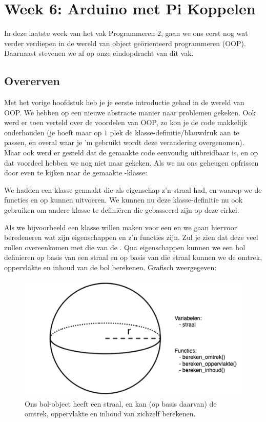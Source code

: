 \chapter{Week 6: Arduino met Pi Koppelen}

In deze laatste week van het vak Programmeren 2, gaan we ons eerst nog wat verder verdiepen in de wereld van object geörienteerd programmeren (OOP). Daarnaast stevenen we af op onze eindopdracht van dit vak.

\section{Overerven}
Met het vorige hoofdstuk heb je je eerste introductie gehad in de wereld van OOP. We hebben op een nieuwe abstracte manier naar problemen gekeken. Ook werd er toen verteld over de voordelen van OOP, zo kon je de code makkelijk onderhouden (je hoeft maar op $1$ plek de klasse-definitie/blauwdruk aan te passen, en overal waar je 'm gebruikt wordt deze verandering overgenomen). Maar ook werd er gesteld dat de gemaakte code eenvoudig uitbreidbaar is, en op dat voordeel hebben we nog niet naar gekeken. Als we nu ons geheugen opfrissen door even te kijken naar de gemaakte -klasse:


We hadden een klasse  gemaakt die als eigenschap z'n straal had, en waarop we de functies  en  op kunnen uitvoeren. We kunnen nu deze klasse-definitie nu ook gebruiken om andere klasse te definiëren die gebasseerd zijn op deze cirkel. \newline 

Als we bijvoorbeeld een klasse willen maken voor een  en we gaan hiervoor beredeneren wat zijn eigenschappen en z'n functies zijn. Zul je zien dat deze veel zullen overeenkomen met die van de . Qua eigenschappen kunnen we een bol definieren op basis van een straal en op basis van die straal kunnen we de omtrek, oppervlakte en inhoud van de bol berekenen. Grafisch weergegeven:
\begin{figure}[h!]
\centering\includegraphics[scale=0.7]{Pictures/chapter08/bol.png}
\caption{\small Ons bol-object heeft een straal, en kan (op basis daarvan) de omtrek, oppervlakte en inhoud van zichzelf berekenen.}
\label{fig:bol} %
\end{figure}


